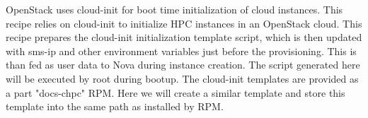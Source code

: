 	OpenStack uses cloud-init for boot time initialization of cloud instances. This recipe relies on cloud-init to initialize HPC instances in an OpenStack cloud. This recipe prepares the cloud-init initialization template script, which is then updated with sms-ip and other environment variables just before the provisioning. This is than fed as user data to Nova during instance creation. The script generated here will be executed by root during bootup. 
The cloud-init templates are provided as a part "docs-chpc" RPM. Here we will create a similar template and store this template into the same path as installed by RPM. 
